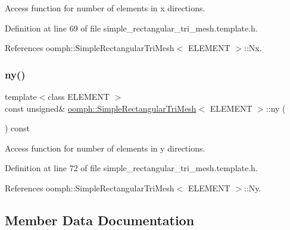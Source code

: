 Access function for number of elements in x directions. 



Definition at line 69 of file simple\+\_\+rectangular\+\_\+tri\+\_\+mesh.\+template.\+h.



References oomph\+::\+Simple\+Rectangular\+Tri\+Mesh$<$ E\+L\+E\+M\+E\+N\+T $>$\+::\+Nx.

\mbox{\label{classoomph_1_1SimpleRectangularTriMesh_a39f3713497e6c9fef258d5f239ad5d3b}} 
\subsubsection{\texorpdfstring{ny()}{ny()}}
{\footnotesize\ttfamily template$<$class E\+L\+E\+M\+E\+NT $>$ \\
const unsigned\& \hyperlink{classoomph_1_1SimpleRectangularTriMesh}{oomph\+::\+Simple\+Rectangular\+Tri\+Mesh}$<$ E\+L\+E\+M\+E\+NT $>$\+::ny (\begin{DoxyParamCaption}{ }\end{DoxyParamCaption}) const\hspace{0.3cm}{\ttfamily [inline]}}



Access function for number of elements in y directions. 



Definition at line 72 of file simple\+\_\+rectangular\+\_\+tri\+\_\+mesh.\+template.\+h.



References oomph\+::\+Simple\+Rectangular\+Tri\+Mesh$<$ E\+L\+E\+M\+E\+N\+T $>$\+::\+Ny.



\subsection{Member Data Documentation}
\mbox{\label{classoomph_1_1SimpleRectangularTriMesh_a85d3446550324f92540d389dfb4d063b}} 
